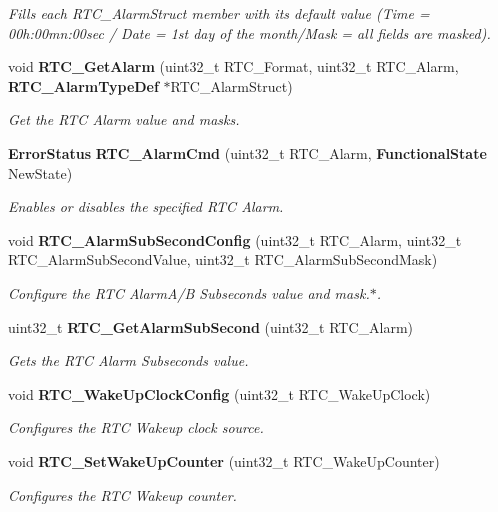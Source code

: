 \begin{DoxyCompactItemize}
\begin{DoxyCompactList}\small\item\em Fills each R\+T\+C\+\_\+\+Alarm\+Struct member with its default value (Time = 00h\+:00mn\+:00sec / Date = 1st day of the month/\+Mask = all fields are masked). \end{DoxyCompactList}\item 
void \textbf{ R\+T\+C\+\_\+\+Get\+Alarm} (uint32\+\_\+t R\+T\+C\+\_\+\+Format, uint32\+\_\+t R\+T\+C\+\_\+\+Alarm, \textbf{ R\+T\+C\+\_\+\+Alarm\+Type\+Def} $\ast$R\+T\+C\+\_\+\+Alarm\+Struct)
\begin{DoxyCompactList}\small\item\em Get the R\+TC Alarm value and masks. \end{DoxyCompactList}\item 
\textbf{ Error\+Status} \textbf{ R\+T\+C\+\_\+\+Alarm\+Cmd} (uint32\+\_\+t R\+T\+C\+\_\+\+Alarm, \textbf{ Functional\+State} New\+State)
\begin{DoxyCompactList}\small\item\em Enables or disables the specified R\+TC Alarm. \end{DoxyCompactList}\item 
void \textbf{ R\+T\+C\+\_\+\+Alarm\+Sub\+Second\+Config} (uint32\+\_\+t R\+T\+C\+\_\+\+Alarm, uint32\+\_\+t R\+T\+C\+\_\+\+Alarm\+Sub\+Second\+Value, uint32\+\_\+t R\+T\+C\+\_\+\+Alarm\+Sub\+Second\+Mask)
\begin{DoxyCompactList}\small\item\em Configure the R\+TC Alarm\+A/B Subseconds value and mask.$\ast$. \end{DoxyCompactList}\item 
uint32\+\_\+t \textbf{ R\+T\+C\+\_\+\+Get\+Alarm\+Sub\+Second} (uint32\+\_\+t R\+T\+C\+\_\+\+Alarm)
\begin{DoxyCompactList}\small\item\em Gets the R\+TC Alarm Subseconds value. \end{DoxyCompactList}\item 
void \textbf{ R\+T\+C\+\_\+\+Wake\+Up\+Clock\+Config} (uint32\+\_\+t R\+T\+C\+\_\+\+Wake\+Up\+Clock)
\begin{DoxyCompactList}\small\item\em Configures the R\+TC Wakeup clock source. \end{DoxyCompactList}\item 
void \textbf{ R\+T\+C\+\_\+\+Set\+Wake\+Up\+Counter} (uint32\+\_\+t R\+T\+C\+\_\+\+Wake\+Up\+Counter)
\begin{DoxyCompactList}\small\item\em Configures the R\+TC Wakeup counter. \end{DoxyCompactList}\item 

\end{DoxyCompactItemize}
